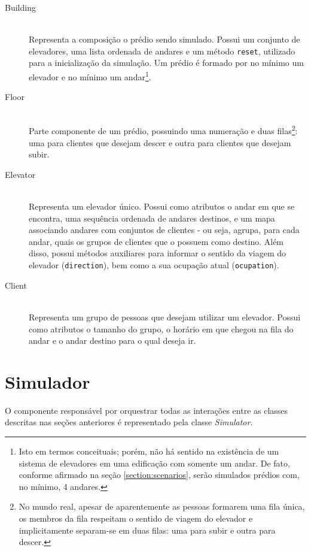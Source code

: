\begin{description}
  \item[Building] \hfill \\
    Representa a composição o prédio sendo simulado. Possui um conjunto de
    elevadores, uma lista ordenada de andares e um método \texttt{reset},
    utilizado para a inicialização da simulação. Um prédio é formado por no
    mínimo um elevador e no mínimo um andar\footnote{Isto em termos conceituais;
    porém, não há sentido na existência de um sistema de elevadores em uma
    edificação com somente um andar. De fato, conforme afirmado na seção
    \ref{section:scenarios}, serão simulados prédios com, no mínimo, 4
    andares.}.

  \item[Floor] \hfill \\
    Parte componente de um prédio, possuindo uma numeração e duas
    filas\footnote{No mundo real, apesar de aparentemente as pessoas formarem
    uma fila única, os membros da fila respeitam o sentido de viagem do elevador
    e implicitamente separam-se em duas filas: uma para subir e outra para
    descer.}: uma para clientes que desejam descer e outra para clientes que
    desejam subir.

\item[Elevator] \hfill \\
    Representa um elevador único. Possui como atributos o andar em que se
    encontra, uma sequência ordenada de andares destinos, e um mapa associando
    andares com conjuntos de clientes - ou seja, agrupa, para cada andar, quais
    os grupos de clientes que o possuem como destino. Além disso, possui métodos
    auxiliares para informar o sentido da viagem do elevador
    (\texttt{direction}), bem como a sua ocupação atual (\texttt{ocupation}).

\item[Client] \hfill \\
    Representa um grupo de pessoas que desejam utilizar um elevador. Possui como
    atributos o tamanho do grupo, o horário em que chegou na fila do andar e o
    andar destino para o qual deseja ir.

\end{description}

\section{Simulador}

O componente responsável por orquestrar todas as interações entre as classes
descritas nas seções anteriores é representado pela classe \textit{Simulator}.

